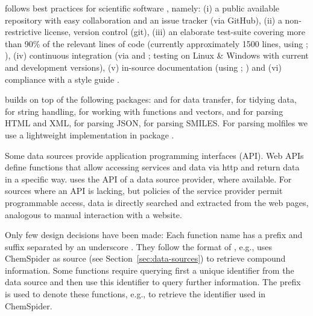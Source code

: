 \documentclass[article]{jss}
\begin{document}
 follows best practices for scientific software
\citep{wilson_best_2014, poisot_best_2015}, namely: (i) a public
available repository with easy collaboration and an issue tracker (via
GitHub), (ii) a non-restrictive license, version control (git), (iii)
an elaborate test-suite covering more than 90\% of the relevant lines
of code (currently approximately 1500 lines, using ;
\citealt{wickham_testthat:_2011}), (iv) continuous integration (via
\citet{travis-ci} and \citet{appveyor}; testing on Linux \& Windows
with current and development  versions), (v) in-source
documentation (using ; \citealt{wickham_roxygen2})
and (vi) compliance with a style guide \citep{wickham_advanced_2015}.

 builds on top of the following  packages:
 \citep{lang_rcurl:_2015} and 
\citep{wickham_httr} for data transfer,  \citep{wickham_dplyr} for tidying data, 
\citep{wickham_stringr:_2015} for string handling,  \citep{wickham_purrr} for working with functions and vectors, 
\citep{wickham_xml2} and  \citep{wickham_rvest} for parsing
HTML and XML,  \citep{ooms_jsonlite_2014} for parsing
JSON,  \citep{guha_rcdk} for parsing SMILES.  For parsing
molfiles we use a lightweight implementation in package 
\citep{Grabner_Varmuza_Dehmer_2012}.

Some data sources provide application programming interfaces (API).
Web APIs define functions that allow accessing services and data via
http and return data in a specific way.   uses the API of
a data source provider, where available.  For sources where an API is
lacking, but policies of the service provider permit programmable access, data is directly searched and extracted from the web pages,
analogous to manual interaction with a website. 

Only few design decisions have been made: Each function name has a
prefix and suffix separated by an underscore
\citep{Chamberlain_Szocs_2013}.  They follow the format of
, e.g.,  uses ChemSpider as
source (see Section~\ref{sec:data-sources}) to retrieve compound
information.  Some functions require querying first a unique
identifier from the data source and then use this identifier to query
further information.  The prefix  is used to denote these
functions, e.g.,  to retrieve the identifier used in
ChemSpider.
\end{document}
